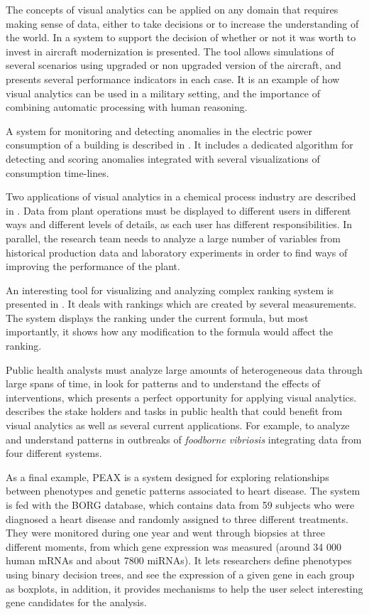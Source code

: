 The concepts of visual analytics can be applied on any domain that requires making sense of data, either to take decisions or to increase the understanding of the world. 
In \autocite{soban_visual_2011} a system to support the decision of whether or not it was worth to invest in aircraft modernization is presented. The tool allows simulations of several scenarios using upgraded or non upgraded version of the aircraft, and presents several performance indicators in each case. It is an example of how visual analytics can be used in a military setting, and the importance of combining automatic processing with human reasoning.

A system for monitoring and detecting anomalies in the electric power consumption of a building is described in \autocite{janetzko_anomaly_2014}. It includes a dedicated algorithm for detecting and scoring anomalies integrated with several visualizations of consumption time-lines.

Two applications of visual analytics in a chemical process industry are described in \autocite{stahl_overview_2013}. Data from plant operations must be displayed to different users in different ways and different levels of details, as each user has different responsibilities. In parallel, the research team needs to analyze a large number of variables from historical production data and laboratory experiments in order to find ways of improving the performance of the plant.

An interesting tool for visualizing and analyzing complex ranking system is presented in \autocite{gratzl_lineup:_2013}. It deals with rankings which are created by several measurements. The system displays the ranking under the current formula, but most importantly, it shows how any modification to the formula would affect the ranking.

Public health analysts must analyze large amounts of heterogeneous data through large spans of time, in look for patterns and to understand the effects of interventions, which presents a perfect opportunity for applying visual analytics. \autocite{sedig_challenge_2014} describes the stake holders and tasks in public health that could benefit from visual analytics as well as several current applications. For example, to analyze and understand patterns in outbreaks of \emph{foodborne vibriosis} integrating data from four different systems.

As a final example, PEAX \autocite{hinterberg_peax:_2014} is a system designed for exploring relationships between phenotypes and genetic patterns associated to heart disease. The system is fed with the BORG database, which contains data from 59 subjects who were diagnosed a heart disease and randomly assigned to three different treatments. They were monitored during one year and went through biopsies at three different moments, from which gene expression was measured (around 34 000 human mRNAs and about 7800 miRNAs). 
It lets researchers define phenotypes using binary decision trees, and see the expression of a given gene in each group as boxplots, in addition, it provides mechanisms to help the user select interesting gene candidates for the analysis.


